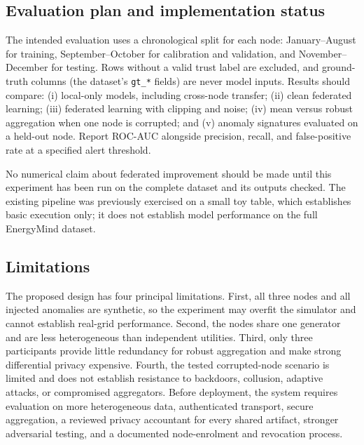 \subsection{Evaluation plan and implementation status}
The intended evaluation uses a chronological split for each node: January--August for training, September--October for calibration and validation, and November--December for testing. Rows without a valid trust label are excluded, and ground-truth columns (the dataset's \texttt{gt\_*} fields) are never model inputs. Results should compare: (i) local-only models, including cross-node transfer; (ii) clean federated learning; (iii) federated learning with clipping and noise; (iv) mean versus robust aggregation when one node is corrupted; and (v) anomaly signatures evaluated on a held-out node. Report ROC-AUC alongside precision, recall, and false-positive rate at a specified alert threshold.

No numerical claim about federated improvement should be made until this experiment has been run on the complete dataset and its outputs checked. The existing pipeline was previously exercised on a small toy table, which establishes basic execution only; it does not establish model performance on the full EnergyMind dataset.

\subsection{Limitations}
The proposed design has four principal limitations. First, all three nodes and all injected anomalies are synthetic, so the experiment may overfit the simulator and cannot establish real-grid performance. Second, the nodes share one generator and are less heterogeneous than independent utilities. Third, only three participants provide little redundancy for robust aggregation and make strong differential privacy expensive. Fourth, the tested corrupted-node scenario is limited and does not establish resistance to backdoors, collusion, adaptive attacks, or compromised aggregators. Before deployment, the system requires evaluation on more heterogeneous data, authenticated transport, secure aggregation, a reviewed privacy accountant for every shared artifact, stronger adversarial testing, and a documented node-enrolment and revocation process.
